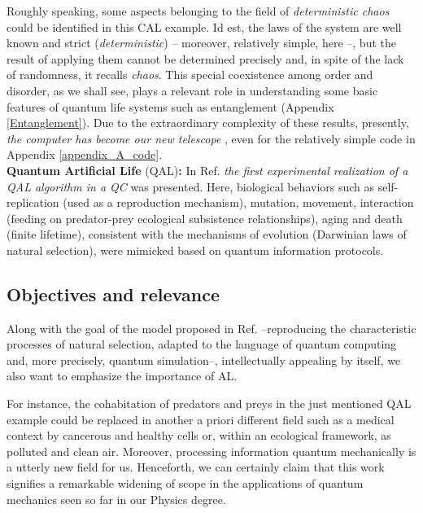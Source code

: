 \documentclass[11pt]{article}
\numberwithin{equation}{section} %
\numberwithin{figure}{section} %
\begin{document}
Roughly speaking, some aspects belonging to the field of \emph{deterministic chaos} could be identified in this CAL example. Id est, the laws of the system are well known and strict (\emph{deterministic}) -- moreover, relatively simple, here --, but the result of applying them cannot be determined precisely and, in spite of the lack of randomness, it recalls \emph{chaos}. This special coexistence among order and disorder, as we shall see, plays a relevant role in understanding some basic features of quantum life systems such as entanglement (Appendix \ref{Entanglement}). Due to the extraordinary complexity of these results, presently, \emph{the computer has become our new telescope} \cite[p.~17-18]{Ricard_Sole}, even for the relatively simple code in Appendix \ref{appendix_A_code}.\\

\textbf{Quantum Artificial Life} (QAL)\textbf{:} In Ref. \cite[p.~1, l.~1-2]{QAL_IBM} \emph{the first experimental realization of a QAL algorithm in a QC} was presented. Here, biological behaviors such as self-replication (used as a reproduction mechanism), mutation, movement, interaction (feeding on predator-prey ecological subsistence relationships), aging and death (finite lifetime), consistent with the mechanisms of evolution (Darwinian laws of natural selection), were mimicked based on quantum information protocols. \\

\subsection{Objectives and relevance} \label{objectives_and_relevance}

Along with the goal of the model proposed in Ref. \cite[p.~2, l.~15-16]{QAL_IBM} --reproducing the characteristic processes of natural selection, adapted to the language of quantum computing and, more precisely, quantum simulation--, intellectually appealing by itself, we also want to emphasize the importance of AL.

For instance, the cohabitation of predators and preys in the just mentioned QAL example could be replaced in another a priori different field such as a medical context by cancerous and healthy cells \cite[p.~49]{Ricard_Sole} or, within an ecological framework, as polluted and clean air. Moreover, processing information quantum mechanically is a utterly new field for us. Henceforth, we can certainly claim that this work signifies a remarkable widening of scope in the applications of quantum mechanics seen so far in our Physics degree.
\end{document}
